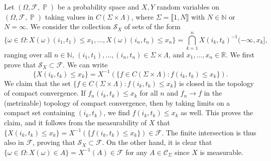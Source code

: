 \documentclass[12pt]{article}
\DeclareMathOperator{\pr}{\mathbb{P}}
\begin{document}
		Let $(\Omega,\mathcal{F},\pr)$ be a probability space and $X,Y$ random variables on $(\Omega,\mathcal{F},\pr)$ taking values in $C(\Sigma\times\Lambda)$, where $\Sigma = \llbracket 1, N\rrbracket$ with $N\in\mathbb{N}$ or $N=\infty$. We consider the collection $\mathcal{S}_X$ of sets of the form
		\[
		\{\omega\in\Omega : X(\omega)(i_1,t_1)\leq x_1,\dots,X(\omega)(i_n,t_n)\leq x_n\} = \bigcap_{k=1}^n X(i_k,t_k)^{-1}(-\infty,x_k],
		\] 
		ranging over all $n\in\mathbb{N}$, $(i_1,t_1),\dots,(i_n,t_n)\in \Sigma\times\Lambda$, and $x_1,\dots,x_n\in\mathbb{R}$. We first prove that $\mathcal{S}_X \subset \mathcal{F}$. We can write 
		\[
		\{X(i_k,t_k)\leq x_k\} = X^{-1}(\{f\in C(\Sigma\times\Lambda):f(i_k,t_k)\leq x_k\}).
		\]
		We claim that the set $\{f\in C(\Sigma\times\Lambda):f(i_k,t_k)\leq x_k\}$ is closed in the topology of compact convergence. If $f_n(i_k,t_k)\leq x_k$ for all $n$ and $f_n\to f$ in the (metrizable) topology of compact convergence, then by taking limits on a compact set containing $(i_k,t_k)$, we find $f(i_k,t_k)\leq x_k$ as well. This proves the claim, and it follows from the measurability of $X$ that $\{X(i_k,t_k)\leq x_k\} = X^{-1}(\{f(i_k,t_k)\leq x_k\})\in\mathcal{F}$. The finite intersection is thus also in $\mathcal{F}$, proving that $\mathcal{S}_X \subset \mathcal{F}$. On the other hand, it is clear that $\{\omega\in\Omega:X(\omega)\in A\} = X^{-1}(A)\in\mathcal{F}$ for any $A\in\mathcal{C}_\Sigma$ since $X$ is measurable.
		
\end{document}
